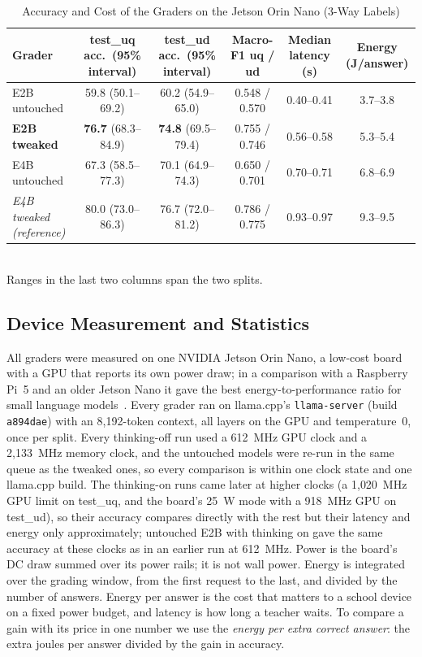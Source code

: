 \documentclass[journal]{IEEEtran}
\begin{document}
\begin{table}[!t]
\centering
\caption{Accuracy and Cost of the Graders on the Jetson Orin Nano (3-Way Labels)}
\label{tab:three}
\begin{tabular}{@{}lccccc@{}}
\toprule
Grader & test\_uq acc.\ (95\% interval) & test\_ud acc.\ (95\% interval) & Macro-F1 uq / ud & Median latency (s) & Energy (J/answer) \\
\midrule
E2B untouched & 59.8 (50.1--69.2) & 60.2 (54.9--65.0) & 0.548 / 0.570 & 0.40--0.41 & 3.7--3.8 \\
\textbf{E2B tweaked} & \textbf{76.7} (68.3--84.9) & \textbf{74.8} (69.5--79.4) & 0.755 / 0.746 & 0.56--0.58 & 5.3--5.4 \\
E4B untouched & 67.3 (58.5--77.3) & 70.1 (64.9--74.3) & 0.650 / 0.701 & 0.70--0.71 & 6.8--6.9 \\
\midrule
\textit{E4B tweaked (reference)} & 80.0 (73.0--86.3) & 76.7 (72.0--81.2) & 0.786 / 0.775 & 0.93--0.97 & 9.3--9.5 \\
\bottomrule
\end{tabular}
\\[2pt]
\footnotesize Ranges in the last two columns span the two splits.
\end{table}

\subsection{Device Measurement and Statistics}
\label{sec:device}
All graders were measured on one NVIDIA Jetson Orin Nano, a low-cost board with a GPU that reports its own power draw; in a comparison with a Raspberry Pi~5 and an older Jetson Nano it gave the best energy-to-performance ratio for small language models~\cite{islam2025edgeenergy}.
Every grader ran on llama.cpp's \texttt{llama-server} (build \texttt{a894dae}) with an 8{,}192-token context, all layers on the GPU and temperature~0, once per split.
Every thinking-off run used a 612~MHz GPU clock and a 2{,}133~MHz memory clock, and the untouched models were re-run in the same queue as the tweaked ones, so every comparison is within one clock state and one llama.cpp build.
The thinking-on runs came later at higher clocks (a 1{,}020~MHz GPU limit on test\_uq, and the board's 25~W mode with a 918~MHz GPU on test\_ud), so their accuracy compares directly with the rest but their latency and energy only approximately; untouched E2B with thinking on gave the same accuracy at these clocks as in an earlier run at 612~MHz.
Power is the board's DC draw summed over its power rails; it is not wall power.
Energy is integrated over the grading window, from the first request to the last, and divided by the number of answers.
Energy per answer is the cost that matters to a school device on a fixed power budget, and latency is how long a teacher waits.
To compare a gain with its price in one number we use the \textit{energy per extra correct answer}: the extra joules per answer divided by the gain in accuracy.
\end{document}
